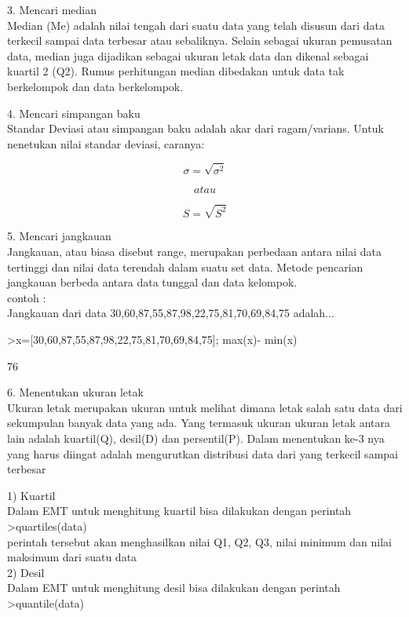 \documentclass[a4paper,10pt]{article}
\begin{document}
\begin{eulernotebook}
\begin{eulercomment}
\begin{eulercomment}
\begin{eulercomment}
3. Mencari median\\
Median (Me) adalah nilai tengah dari suatu data yang telah disusun
dari data terkecil sampai data terbesar atau sebaliknya. Selain
sebagai ukuran pemusatan data, median juga dijadikan sebagai ukuran
letak data dan dikenal sebagai kuartil 2 (Q2). Rumus perhitungan
median dibedakan untuk data tak berkelompok dan data berkelompok.

4. Mencari simpangan baku\\
Standar Deviasi atau simpangan baku adalah akar dari ragam/varians.
Untuk nenetukan nilai standar deviasi, caranya:

\end{eulercomment}
\begin{eulerformula}
\[
\sigma=\sqrt{\sigma^2}
\]
\end{eulerformula}
\begin{eulerformula}
\[
atau
\]
\end{eulerformula}
\begin{eulerformula}
\[
S=\sqrt{S^2}
\]
\end{eulerformula}
\begin{eulercomment}
5. Mencari jangkauan\\
Jangkauan, atau biasa disebut range, merupakan perbedaan antara nilai
data tertinggi dan nilai data terendah dalam suatu set data. Metode
pencarian jangkauan berbeda antara data tunggal dan data kelompok.\\
contoh :\\
Jangkauan dari data 30,60,87,55,87,98,22,75,81,70,69,84,75 adalah...
\end{eulercomment}
\begin{eulerprompt}
>x=[30,60,87,55,87,98,22,75,81,70,69,84,75]; max(x)- min(x)
\end{eulerprompt}
\begin{euleroutput}
  76
\end{euleroutput}
\begin{eulercomment}
6. Menentukan ukuran letak\\
Ukuran letak merupakan ukuran untuk melihat dimana letak salah satu
data dari sekumpulan banyak data yang ada. Yang termasuk ukuran ukuran
letak antara lain adalah kuartil(Q), desil(D) dan persentil(P). Dalam
menentukan ke-3 nya yang harus diingat adalah mengurutkan distribusi
data dari yang terkecil sampai terbesar

1) Kuartil\\
Dalam EMT untuk menghitung kuartil bisa dilakukan dengan perintah\\
\textgreater{}quartiles(data)\\
perintah tersebut akan menghasilkan nilai Q1, Q2, Q3, nilai minimum
dan nilai maksimum dari suatu data\\
2) Desil\\
Dalam EMT untuk menghitung desil bisa dilakukan dengan perintah\\
\textgreater{}quantile(data)


\end{eulercomment}
\end{eulercomment}
\end{eulercomment}
\end{eulernotebook}
\end{document}
